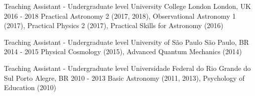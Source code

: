 

\begin{cventries}

  \cventry
    {Teaching Assistant - Undergraduate level} %
    {University College London} %
    {London, UK} %
    {2016 - 2018} %
    {
        Practical Astronomy 2 (2017, 2018), Observational Astronomy 1 (2017), Practical Physics 2 (2017), Practical Skills for Astronomy (2016)
    }

  \cventry
    {Teaching Assistant - Undergraduate level} %
    {University of S\~{a}o Paulo} %
    {S\~{a}o Paulo, BR} %
    {2014 - 2015} %
    {
        Physical Cosmology (2015), Advanced Quantum Mechanics (2014)
    }

  \cventry
    {Teaching Assistant - Undergraduate level} %
    {Universidade Federal do Rio Grande do Sul} %
    {Porto Alegre, BR} %
    {2010 - 2013} %
    {
        Basic Astronomy (2011, 2013), Psychology of Education (2010)
    }

\end{cventries}
